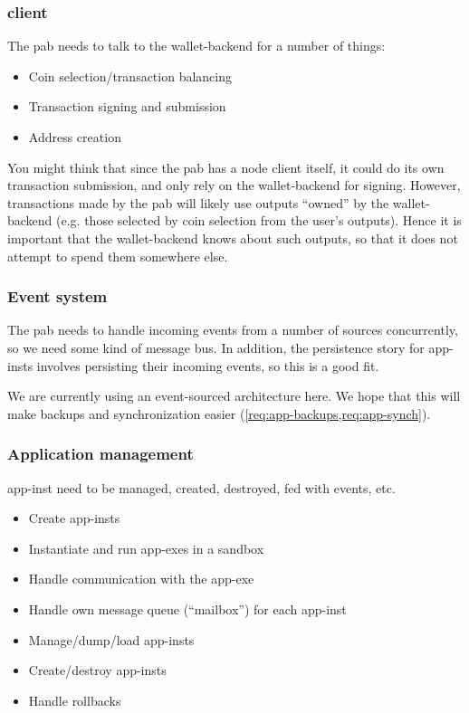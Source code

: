 \documentclass[plutus.tex]{subfiles}
\begin{document}
\subsubsection{ client}

The \gls{pab} needs to talk to the \gls{wallet-backend} for a number of things:
\begin{itemize}
\item Coin selection/transaction balancing
\item Transaction signing and submission
\item Address creation
\end{itemize}

You might think that since the \gls{pab} has a node client itself, it could do its own transaction submission, and only rely on the \gls{wallet-backend} for signing.
However, transactions made by the \gls{pab} will likely use outputs ``owned'' by the \gls{wallet-backend} (e.g. those selected by coin selection from the user's outputs).
Hence it is important that the \gls{wallet-backend} knows about such outputs, so that it does not attempt to spend them somewhere else.

\subsubsection{Event system}

The \gls{pab} needs to handle incoming events from a number of sources concurrently, so we need some kind of message bus.
In addition, the persistence story for \glspl{app-inst} involves persisting their incoming events, so this is a good fit.

We are currently using an event-sourced architecture here.
We hope that this will make backups and synchronization easier (\cref{req:app-backups,req:app-synch}).

\subsubsection{Application management}

\Gls{app-inst} need to be managed, created, destroyed, fed with events, etc.

\begin{itemize}
\item Create \glspl{app-inst}
\item Instantiate and run \glspl{app-exe} in a sandbox
\item Handle communication with the \gls{app-exe}
\item Handle own message queue (``mailbox'') for each \gls{app-inst}
\item Manage/dump/load \glspl{app-inst}
\item Create/destroy \glspl{app-inst}
\item Handle rollbacks
\end{itemize}
\end{document}
